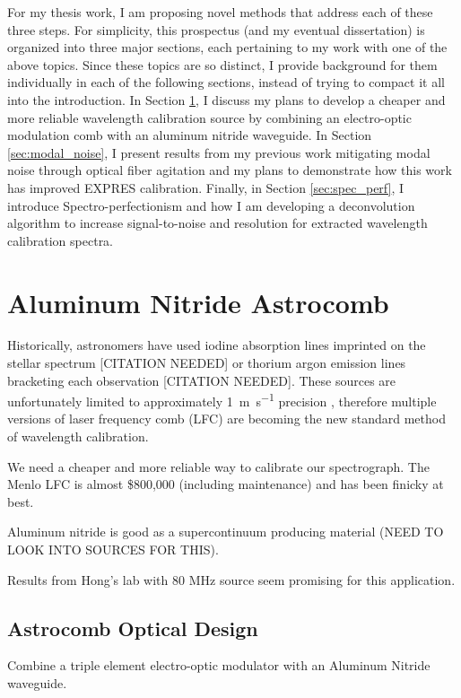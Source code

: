 \documentclass[11pt]{article}
\begin{document}
For my thesis work, I am proposing novel methods that address each of these three steps. For simplicity, this prospectus (and my eventual dissertation) is organized into three major sections, each pertaining to my work with one of the above topics. Since these topics are so distinct, I provide background for them individually in each of the following sections, instead of trying to compact it all into the introduction. In Section \ref{sec:astrocomb}, I discuss my plans to develop a cheaper and more reliable wavelength calibration source by combining an electro-optic modulation comb with an aluminum nitride waveguide. In Section \ref{sec:modal_noise}, I present results from my previous work mitigating modal noise through optical fiber agitation and my plans to demonstrate how this work has improved EXPRES calibration. Finally, in Section \ref{sec:spec_perf}, I introduce Spectro-perfectionism and how I am developing a deconvolution algorithm to increase signal-to-noise and resolution for extracted wavelength calibration spectra.

\section{Aluminum Nitride Astrocomb}
\label{sec:astrocomb}

Historically, astronomers have used iodine absorption lines imprinted on the stellar spectrum [CITATION NEEDED] or thorium argon emission lines bracketing each observation [CITATION NEEDED]. These sources are unfortunately limited to approximately \SI{1}{\meter\per\second} precision \cite{Fischer2016}, therefore multiple versions of laser frequency comb (LFC) are becoming the new standard method of wavelength calibration.

We need a cheaper and more reliable way to calibrate our spectrograph. The Menlo LFC is almost \$800,000 (including maintenance) and has been finicky at best.

Aluminum nitride is good as a supercontinuum producing material (NEED TO LOOK INTO SOURCES FOR THIS).

Results from Hong's lab with 80 MHz source seem promising for this application.

\subsection{Astrocomb Optical Design}

Combine a triple element electro-optic modulator with an Aluminum Nitride waveguide.
\end{document}
